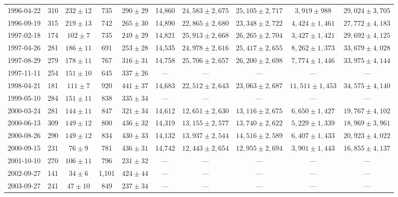 \begin{landscape}
\begin{longtable}{cccccccccc}
{1996-04-22} & 310 & {$232  \pm  12$} & 735 & {$290 \pm 29$} & 14,860 & {$24,583 \pm 2,675$} & {$25,105 \pm 2,717$} & {$3,919 \pm 988$} & {$29,024 \pm 3,705$} \\
{1996-09-19} & 315 & {$219  \pm  13$} & 742 & {$265 \pm 30$} & 14,890 & {$22,865 \pm 2,680$} & {$23,348 \pm 2,722$} & {$4,424 \pm 1,461$} & {$27,772 \pm 4,183$} \\
{1997-02-18} & 174 & {$102  \pm  7$} & 735 & {$249 \pm 29$} & 14,821 & {$25,913 \pm 2,668$} & {$26,265 \pm 2,704$} & {$3,427 \pm 1,421$} & {$29,692 \pm 4,125$} \\
{1997-04-26} & 281 & {$186  \pm  11$} & 691 & {$253 \pm 28$} & 14,535 & {$24,978 \pm 2,616$} & {$25,417 \pm 2,655$} & {$8,262 \pm 1,373$} & {$33,679 \pm 4,028$} \\
{1997-08-29} & 279 & {$178  \pm  11$} & 767 & {$316 \pm 31$} & 14,758 & {$25,706 \pm 2,657$} & {$26,200 \pm 2,698$} & {$7,774 \pm 1,446$} & {$33,975 \pm 4,144$} \\
{1997-11-11} & 254 & {$151  \pm  10$} & 645 & {$337 \pm 26$} & --- & --- & --- & --- & --- \\
{1998-04-21} & 181 & {$111  \pm  7$} & 920 & {$441 \pm 37$} & 14,683 & {$22,512 \pm 2,643$} & {$23,063 \pm 2,687$} & {$11,511 \pm 1,453$} & {$34,575 \pm 4,140$} \\
{1999-05-10} & 284 & {$151  \pm  11$} & 838 & {$335 \pm 34$} & --- & --- & --- & --- & --- \\
{2000-03-24} & 281 & {$144  \pm  11$} & 847 & {$321 \pm 34$} & 14,612 & {$12,651 \pm 2,630$} & {$13,116 \pm 2,675$} & {$6,650 \pm 1,427$} & {$19,767 \pm 4,102$} \\
{2000-06-13} & 309 & {$149  \pm  12$} & 800 & {$436 \pm 32$} & 14,319 & {$13,155 \pm 2,577$} & {$13,740 \pm 2,622$} & {$5,229 \pm 1,339$} & {$18,969 \pm 3,961$} \\
{2000-08-26} & 290 & {$149  \pm  12$} & 834 & {$430 \pm 33$} & 14,132 & {$13,937 \pm 2,544$} & {$14,516 \pm 2,589$} & {$6,407 \pm 1,433$} & {$20,923 \pm 4,022$} \\
{2000-09-15} & 231 & {$76  \pm  9$} & 781 & {$436 \pm 31$} & 14,742 & {$12,443 \pm 2,654$} & {$12,955 \pm 2,694$} & {$3,901 \pm 1,443$} & {$16,855 \pm 4,137$} \\
{2001-10-10} & 270 & {$106  \pm  11$} & 796 & {$231 \pm 32$} & --- & --- & --- & --- & --- \\
{2002-09-27} & 141 & {$34  \pm  6$} & 1,101 & {$424 \pm 44$} & --- & --- & --- & --- & --- \\
{2003-09-27} & 241 & {$47  \pm  10$} & 849 & {$237 \pm 34$} & --- & --- & --- & --- & --- \\

\end{longtable}
\end{landscape}
